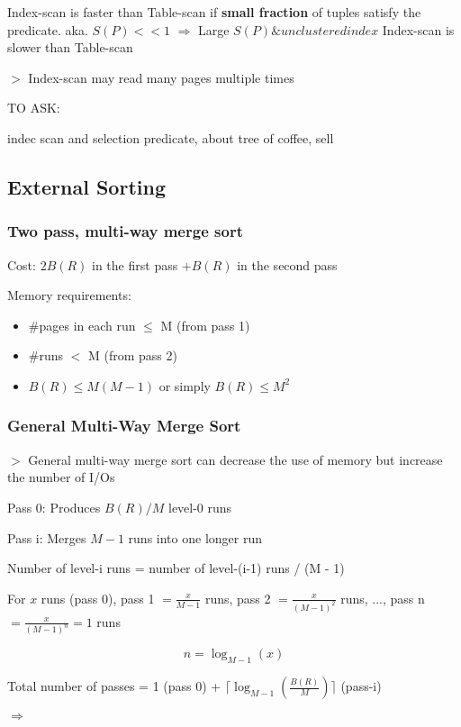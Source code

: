 \documentclass[12pt,a4paper]{article}
\newcommand{\remark}[1]{
    $>$ {\color{blue} #1}
}
\begin{document}
Index-scan is faster than Table-scan if \textbf{small fraction} of tuples satisfy the predicate. aka. $S(P) << 1$
$\Rightarrow$ Large $S(P) \& unclustered index$ Index-scan is slower than Table-scan

\remark{Index-scan may read many pages multiple times}

TO ASK:

indec scan and selection predicate, about tree of coffee, sell

\subsection*{External Sorting}

\subsubsection*{Two pass, multi-way merge sort}

Cost: $2B(R)$ in the first pass $+ B(R)$ in the second pass

Memory requirements:

\begin{itemize}
    \item \#pages in each run $\leq$ M (from pass 1)
    \item \#runs $<$ M (from pass 2)
    \item $B(R) \leq M(M-1)$ or simply $B(R) \leq M^2$
\end{itemize}

\subsubsection*{General Multi-Way Merge Sort}

\remark{General multi-way merge sort can decrease the use of memory but increase the number of I/Os}

Pass 0: Produces $B(R)/M$ level-0 runs

Pass i: Merges $M - 1$ runs into one longer run

Number of level-i runs = number of level-(i-1) runs / (M - 1)

For $x$ runs (pass 0), pass 1 $= \frac{x}{M-1}$ runs,
pass 2 $= \frac{x}{(M-1)^2}$ runs, ..., pass n $= \frac{x}{(M-1)^n} = 1$ runs

\[n = \log_{M-1}(x)\]

Total number of passes = 1 (pass 0) + $\lceil \log_{M-1}(\frac{B(R)}{M}) \rceil$ (pass-i)

$\Rightarrow$
\end{document}
